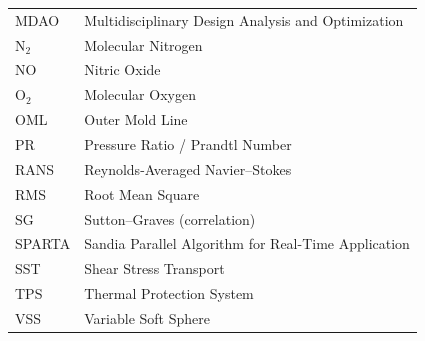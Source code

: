 \begin{longtable}{|p{4.0cm}|p{8.2cm}|}
    MDAO        & Multidisciplinary Design Analysis and Optimization \\
    N$_2$       & Molecular Nitrogen                     \\
    NO          & Nitric Oxide                           \\
    O$_2$       & Molecular Oxygen                       \\
    OML         & Outer Mold Line                        \\
    PR          & Pressure Ratio / Prandtl Number        \\
    RANS        & Reynolds-Averaged Navier--Stokes       \\
    RMS         & Root Mean Square                       \\
    SG          & Sutton--Graves (correlation)           \\
    SPARTA      & Sandia Parallel Algorithm for Real-Time Application \\
    SST         & Shear Stress Transport                 \\
    TPS         & Thermal Protection System              \\
    VSS         & Variable Soft Sphere                   \\
\hline
\end{longtable}
\endgroup
